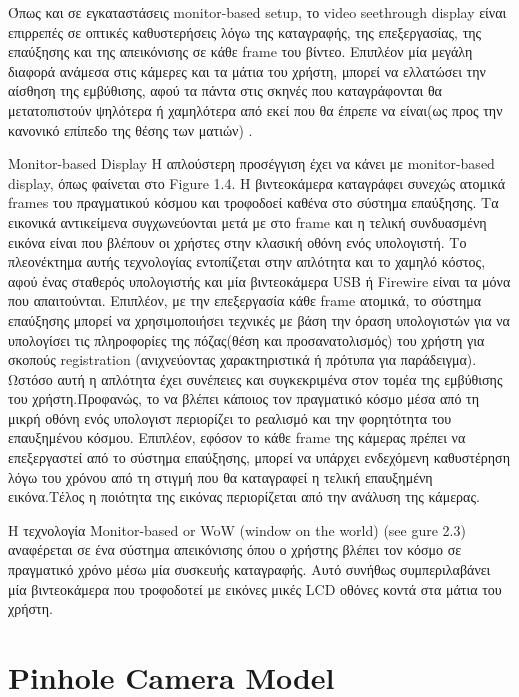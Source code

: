 Όπως και σε εγκαταστάσεις monitor-based setup, το video seethrough display είναι επιρρεπές σε οπτικές καθυστερήσεις λόγω της καταγραφής, της επεξεργασίας, της επαύξησης και της απεικόνισης σε κάθε frame του βίντεο. Επιπλέον μία μεγάλη διαφορά ανάμεσα στις κάμερες και τα μάτια του χρήστη, μπορεί να ελλατώσει την αίσθηση της εμβύθισης, αφού τα πάντα στις σκηνές που καταγράφονται θα μετατοπιστούν ψηλότερα ή χαμηλότερα από εκεί που θα έπρεπε να είναι(ως προς την κανονικό επίπεδο της θέσης των ματιών) \cite{Malik2002} . 






Monitor-based Display
Η απλούστερη προσέγγιση έχει να κάνει με monitor-based display, όπως φαίνεται στο Figure 1.4. Η βιντεοκάμερα καταγράφει συνεχώς ατομικά frames του πραγματικού κόσμου και τροφοδοεί καθένα στο σύστημα επαύξησης. Τα εικονικά αντικείμενα συγχωνεύονται μετά με στο frame και η τελική συνδυασμένη εικόνα είναι που βλέπουν οι χρήστες στην κλασική οθόνη ενός υπολογιστή. Το πλεονέκτημα αυτής τεχνολογίας εντοπίζεται στην απλότητα και το χαμηλό κόστος, αφού ένας σταθερός υπολογιστής και μία βιντεοκάμερα USB ή Firewire είναι τα μόνα που απαιτούνται. Επιπλέον, με την επεξεργασία κάθε frame ατομικά, το σύστημα επαύξησης μπορεί να χρησιμοποιήσει τεχνικές με βάση την όραση υπολογιστών για να υπολογίσει τις πληροφορίες της πόζας(θέση και προσανατολισμός) του χρήστη για σκοπούς registration (ανιχνεύοντας χαρακτηριστικά ή πρότυπα για παράδειγμα). Ωστόσο αυτή η απλότητα έχει συνέπειες και συγκεκριμένα στον τομέα της εμβύθισης του χρήστη.Προφανώς, το να βλέπει κάποιος τον πραγματικό κόσμο μέσα από τη μικρή οθόνη ενός υπολογιστ περιορίζει το ρεαλισμό και την φορητότητα του επαυξημένου κόσμου. Επιπλέον, εφόσον το κάθε frame της κάμερας πρέπει να επεξεργαστεί από το σύστημα επαύξησης, μπορεί να υπάρχει ενδεχόμενη καθυστέρηση λόγω του χρόνου από τη στιγμή που θα καταγραφεί η τελική επαυξημένη εικόνα.Τέλος η ποιότητα της εικόνας περιορίζεται από την ανάλυση της κάμερας. 

Η τεχνολογία  Monitor-based or WoW (window on the world) (see gure 2.3) αναφέρεται σε ένα σύστημα απεικόνισης όπου ο χρήστης βλέπει τον κόσμο σε πραγματικό χρόνο μέσω μία συσκευής καταγραφής. Αυτό  συνήθως συμπεριλαβάνει μία βιντεοκάμερα που τροφοδοτεί με εικόνες μικές LCD οθόνες κοντά στα μάτια του χρήστη.


\section{Pinhole Camera Model}

